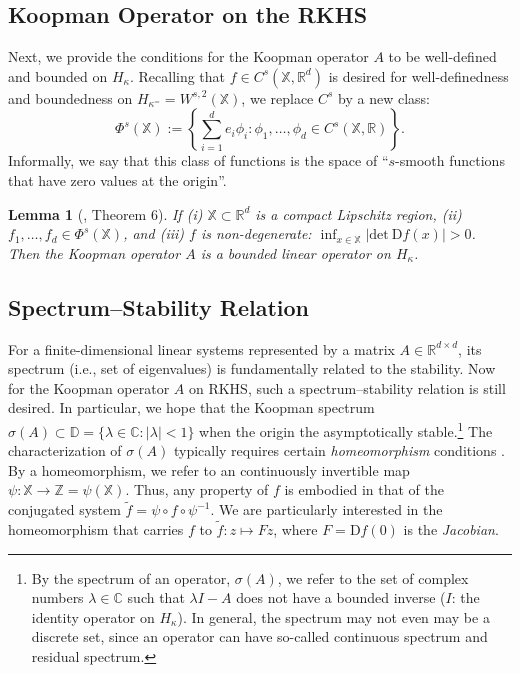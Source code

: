 \documentclass[english]{cccconf}
\renewcommand{\emph}[1]{\textit{#1}}
\newtheorem{lemma}{Lemma}
\newcommand{\mr}[1]{\mathrm{#1}}
\newcommand{\mbb}[1]{\mathds{#1}} %
\newcommand{\mR}{\mbb{R}}
\newcommand{\mC}{\mbb{C}}
\newcommand{\mD}{\mbb{D}}
\newcommand{\mX}{\mbb{X}}
\newcommand{\BRA}[1]{\left\{ #1 \right\}}
\begin{document}
\subsection{Koopman Operator on the RKHS}
Next, we provide the conditions for the Koopman operator $A$ to be well-defined and bounded on $H_\kappa$. Recalling that $f\in C^s(\mX, \mR^d)$ is desired for well-definedness and boundedness on $H_{\kappa^=}= W^{s,2}(\mX)$, we replace $C^s$ by a new class:
\begin{equation}\label{eq:F.class}
\textstyle
    \Phi^s(\mX) := \BRA{\sum_{i=1}^d e_i\phi_i: \phi_1, \dots,\phi_d\in C^s(\mX, \mR)}. 
\end{equation}
Informally, we say that this class of functions is the space of ``$s$-smooth functions that have zero values at the origin''. 
\begin{lemma}[\cite{tang-ye-2025-l4dc}, Theorem 6]
\label{lem:definedness}
    If (i) $\mbb{X}\subset\mR^d$ is a compact Lipschitz region, (ii) $f_1, \dots, f_d \in \Phi^s(\mbb{X})$, and (iii) $f$ is non-degenerate: $\inf_{x\in \mbb{X}} \lvert \mr{det}~\mr{D}f(x) \rvert > 0$. Then the Koopman operator $A$ is a bounded linear operator on $H_\kappa$.
\end{lemma}


\subsection{Spectrum--Stability Relation}
For a finite-dimensional linear systems represented by a matrix $A\in \mR^{d\times d}$, its spectrum (i.e., set of eigenvalues) is fundamentally related to the stability. Now for the Koopman operator $A$ on RKHS, such a spectrum--stability relation is still desired. 
In particular, we hope that the Koopman spectrum $\sigma(A)\subset \mD = \{\lambda \in \mC: |\lambda|<1\}$ when the origin the asymptotically stable.\footnote{By the spectrum of an operator, $\sigma(A)$, we refer to the set of complex numbers $\lambda\in \mC$ such that $\lambda I - A$ does not have a bounded inverse ($I$: the identity operator on $H_\kappa$). In general, the spectrum may not even may be a discrete set, since an operator can have so-called continuous spectrum and residual spectrum.} 
The characterization of $\sigma(A)$ typically requires certain \emph{homeomorphism} conditions \cite{mezic2020spectrum}. By a homeomorphism, we refer to an continuously invertible map $\psi: \mbb{X}\rightarrow \mbb{Z} = \psi(\mbb{X})$. Thus, any property of $f$ is embodied in that of the conjugated system $\tilde{f} = \psi\circ f \circ \psi^{-1}$. 
We are particularly interested in the homeomorphism that carries $f$ to $\tilde{f}: z\mapsto Fz$, where $F = \mr{D}f(0)$ is the \emph{Jacobian}. 
\end{document}
